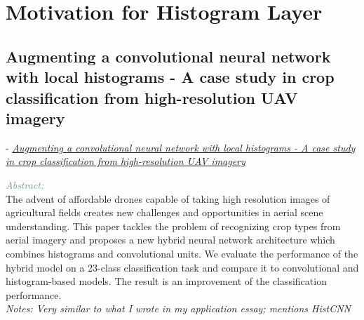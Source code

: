 \documentclass[]{article}
\newcommand{\paperentry}[4]{
            \hangindent=1cm
            \cite{#1} - \href{run:../References/#3}{\textcolor{Sepia}{\textit{#2}}}
            
            \noindent            
            \begin{minipage}[t]{0.1\linewidth}\hfill\end{minipage}
            \begin{minipage}[t]{0.8\linewidth}\textcolor{CadetBlue}{{\textit{Abstract:}}}\\#4\end{minipage}
            \vspace{.25cm}
          }
\begin{document}
 			
 \section{Motivation for Histogram Layer}
 \subsection{Augmenting a convolutional neural network with local histograms - A case study in crop classification from high-resolution UAV imagery} 			
 \paperentry{rebetez2016augmenting}
 {Augmenting a convolutional neural network with
 	local histograms - A case study in crop
 	classification from high-resolution UAV imagery}
 {Existing Histogram Layers/uavhist.pdf}
 {The advent of affordable drones capable of taking high resolution images of agricultural fields creates new challenges and opportunities
 	in aerial scene understanding. This paper tackles the problem of recognizing crop types from aerial imagery and proposes a new hybrid neural
 	network architecture which combines histograms and convolutional units.
 	We evaluate the performance of the hybrid model on a 23-class classification task and compare it to convolutional and histogram-based models.
 	The result is an improvement of the classification performance.
 	\\\emph{Notes: Very similar to what I wrote in my application essay; mentions HistCNN}} \\ 

 
\end{document}
